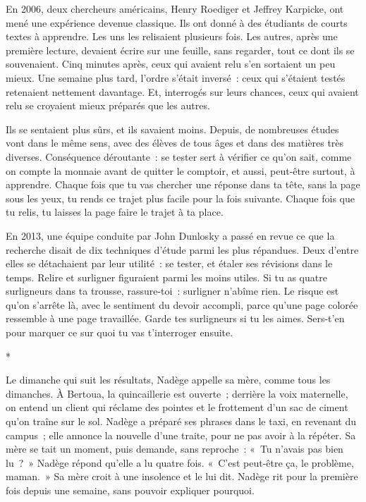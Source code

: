 \documentclass[10.5pt,twoside,openright]{book}
\newcommand{\asterisme}{\par\vspace{0.7em}\centerline{\color{gris}*\quad*\quad*}\vspace{0.7em}\par\noindent}
\begin{document}
En 2006, deux chercheurs américains, Henry Roediger et Jeffrey Karpicke, ont mené une expérience devenue classique. Ils ont donné à des étudiants de courts textes à apprendre. Les uns les relisaient plusieurs fois. Les autres, après une première lecture, devaient écrire sur une feuille, sans regarder, tout ce dont ils se souvenaient. Cinq minutes après, ceux qui avaient relu s’en sortaient un peu mieux. Une semaine plus tard, l’ordre s’était inversé : ceux qui s’étaient testés retenaient nettement davantage. Et, interrogés sur leurs chances, ceux qui avaient relu se croyaient mieux préparés que les autres.

Ils se sentaient plus sûrs, et ils savaient moins. Depuis, de nombreuses études vont dans le même sens, avec des élèves de tous âges et dans des matières très diverses. Conséquence déroutante : se tester sert à vérifier ce qu’on sait, comme on compte la monnaie avant de quitter le comptoir, et aussi, peut-être surtout, à apprendre. Chaque fois que tu vas chercher une réponse dans ta tête, sans la page sous les yeux, tu rends ce trajet plus facile pour la fois suivante. Chaque fois que tu relis, tu laisses la page faire le trajet à ta place.

En 2013, une équipe conduite par John Dunlosky a passé en revue ce que la recherche disait de dix techniques d’étude parmi les plus répandues. Deux d’entre elles se détachaient par leur utilité : se tester, et étaler ses révisions dans le temps. Relire et surligner figuraient parmi les moins utiles. Si tu as quatre surligneurs dans ta trousse, rassure-toi : surligner n’abîme rien. Le risque est qu’on s’arrête là, avec le sentiment du devoir accompli, parce qu’une page colorée ressemble à une page travaillée. Garde tes surligneurs si tu les aimes. Sers-t’en pour marquer ce sur quoi tu vas t’interroger ensuite.

\asterisme

Le dimanche qui suit les résultats, Nadège appelle sa mère, comme tous les dimanches. À Bertoua, la quincaillerie est ouverte ; derrière la voix maternelle, on entend un client qui réclame des pointes et le frottement d’un sac de ciment qu’on traîne sur le sol. Nadège a préparé ses phrases dans le taxi, en revenant du campus ; elle annonce la nouvelle d’une traite, pour ne pas avoir à la répéter. Sa mère se tait un moment, puis demande, sans reproche : « Tu n’avais pas bien lu ? » Nadège répond qu’elle a lu quatre fois. « C’est peut-être ça, le problème, maman. » Sa mère croit à une insolence et le lui dit. Nadège rit pour la première fois depuis une semaine, sans pouvoir expliquer pourquoi.
\end{document}
